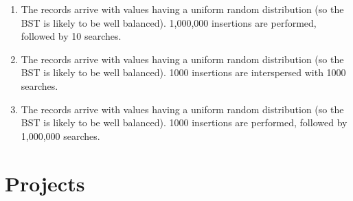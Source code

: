 \begin{exercises}
\begin{enumerate}
\item
The records arrive with values having a uniform random
distribution (so the BST is likely to be well balanced).
1,000,000 insertions are performed, followed by 10 searches.

\item
The records arrive with values having a uniform random
distribution (so the BST is likely to be well balanced).
1000 insertions are interspersed with 1000 searches.

\item
The records arrive with values having a uniform random
distribution (so the BST is likely to be well balanced).
1000 insertions are performed, followed by 1,000,000 searches.
\end{enumerate}

\end{exercises}

\section{Projects}

